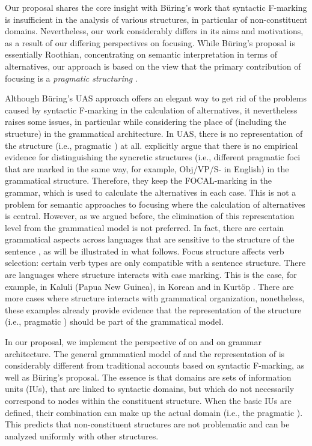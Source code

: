 \documentclass[output=paper,colorlinks,citecolor=brown]{langscibook}
\begin{document}
Our proposal shares the core insight with Büring's work that syntactic F-marking is insufficient in the analysis of various  structures, in particular of non-constituent  domains. Nevertheless, our work considerably differs in its aims and motivations, as a result of our differing perspectives on focusing. While B\"uring's proposal is essentially Roothian, concentrating on semantic interpretation in terms of alternatives, our approach is based on the view that the primary contribution of focusing is a \textit{pragmatic structuring} \citep[][]{lambrecht:94,vvlp:97}. 

Although B\"uring's UAS approach offers an elegant way to get rid of the problems caused by syntactic F-marking in the calculation of alternatives, it nevertheless raises some issues, in particular while considering the place of  (including the  structure) in the grammatical architecture. In UAS, there is no representation of the  structure (i.e., pragmatic ) at all. \citet{assmann:etal:23} explicitly argue that there is no empirical evidence for distinguishing the syncretic  structures (i.e., different pragmatic foci that are marked in the same way, for example, Obj/VP/S- in English) in the grammatical structure. Therefore, they keep the FOCAL-marking in the grammar, which is used to calculate the alternatives in each case. This is not a problem for semantic approaches to focusing where the calculation of alternatives is central. However, as we argued before, the elimination of this representation level from the grammatical model is not preferred. In fact, there are certain grammatical aspects across languages that are sensitive to the  structure of the sentence \citep[see, e.g.,][]{lvv:23,bentley:23}, as will be illustrated in what follows. Focus structure affects verb selection: certain verb types are only compatible with a sentence  structure. There are languages where  structure interacts with case marking. This is the case, for example, in Kaluli (Papua New Guinea), in Korean \citep[see][]{lvv:23,bentley:23} and in Kurt\"op  \citep[Tibeto-Burman;][]{hyslop:10}. There are more cases where  structure interacts with grammatical organization, nonetheless, these examples already provide evidence that the representation of the  structure (i.e., pragmatic ) should be part of the grammatical model. 

In our proposal, we implement the perspective of  on  and on grammar architecture. The general grammatical model of  and the representation of  is considerably different from traditional accounts based on syntactic F-marking, as well as B\"uring's proposal. The essence is that  domains are sets of information units (IUs), that are linked to syntactic domains, but which do not necessarily correspond to nodes within the constituent structure. When the basic IUs are defined, their combination can make up the actual  domain (i.e., the pragmatic ). This predicts that non-constituent  structures are not problematic and can be analyzed uniformly with other  structures.
\end{document}
